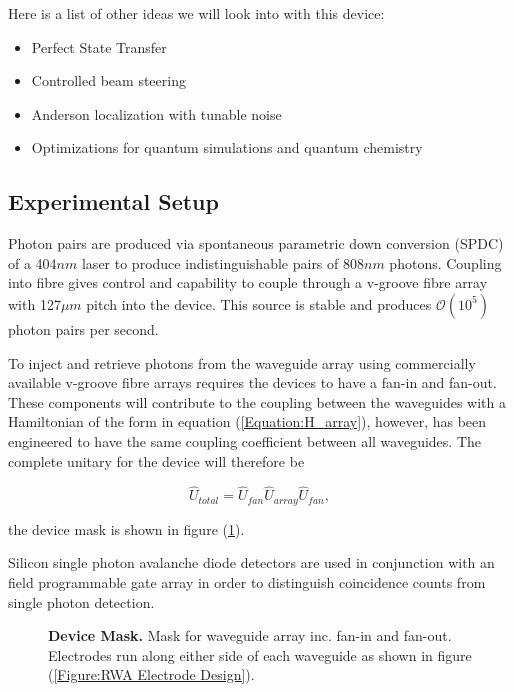 \documentclass[11pt,a4paper]{article}
\begin{document}
\noindent Here is a list of other ideas we will look into with this device:

\begin{itemize}
\item Perfect State Transfer
\item Controlled beam steering
\item Anderson localization with tunable noise
\item Optimizations for quantum simulations and quantum chemistry
\end{itemize}

\subsection*{Experimental Setup}

Photon pairs are produced via spontaneous parametric down conversion (SPDC) of a 404$nm$ laser to produce indistinguishable pairs of 808$nm$ photons. Coupling into fibre gives control and capability to couple through a v-groove fibre array with 127$\mu m$ pitch into the device. This source is stable and produces $\mathcal{O}(10^5)$ photon pairs per second.

To inject and retrieve photons from the waveguide array using commercially available v-groove fibre arrays requires the devices to have a fan-in and fan-out. These components will contribute to the coupling between the waveguides with a Hamiltonian of the form in equation (\ref{Equation:H_array}), however, has been engineered to have the same coupling coefficient between all waveguides. The complete unitary for the device will therefore be

\begin{equation}
\hat{U}_{total} = \hat{U}_{fan}\hat{U}_{array}\hat{U}_{fan},
\end{equation}

\noindent the device mask is shown in figure (\ref{Figure:Mask}).

Silicon single photon avalanche diode detectors are used in conjunction with an field programmable gate array in order to distinguish coincidence counts from single photon detection. 
 \\
\begin{figure}[h]
\caption{\small \textbf{Device Mask.} Mask for waveguide array inc. fan-in and fan-out. Electrodes run along either side of each waveguide as shown in figure (\ref{Figure:RWA Electrode Design}).}
\label{Figure:Mask}
\end{figure}
\end{document}
